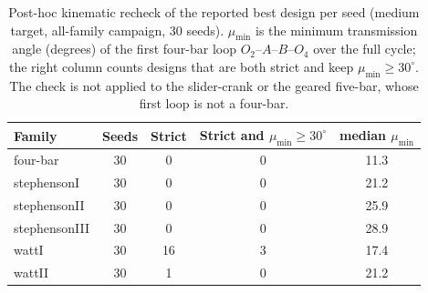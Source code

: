 \begin{table}[H]
\caption{Post-hoc kinematic recheck of the reported best design per seed (medium target, all-family campaign, 30 seeds). $\mu_{\min}$ is the minimum transmission angle (degrees) of the first four-bar loop $O_2$--$A$--$B$--$O_4$ over the full cycle; the right column counts designs that are both strict and keep $\mu_{\min} \geq 30^{\circ}$. The check is not applied to the slider-crank or the geared five-bar, whose first loop is not a four-bar.}
\label{tab:transmission_recheck}
\centering
\begin{tabular}{@{}lcccc@{}}
\hline
Family & Seeds & Strict & Strict and $\mu_{\min}\geq 30^{\circ}$ & median $\mu_{\min}$ \\
\hline
four-bar & 30 & 0 & 0 & 11.3 \\
stephensonI & 30 & 0 & 0 & 21.2 \\
stephensonII & 30 & 0 & 0 & 25.9 \\
stephensonIII & 30 & 0 & 0 & 28.9 \\
wattI & 30 & 16 & 3 & 17.4 \\
wattII & 30 & 1 & 0 & 21.2 \\
\hline
\end{tabular}
\end{table}